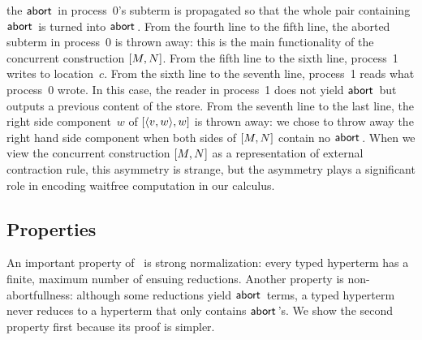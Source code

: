 \begin{example}
 the $\mathsf{abort\,}$ in process~0's subterm is propagated so that the whole pair
 containing $\mathsf{abort\,}$ is turned into $\mathsf{abort\,}$.
 From the fourth line to the fifth line,
 the aborted subterm in process~0 is thrown away: this is
 the main functionality of the concurrent construction $[{M,N}]$.
 From the fifth line to the sixth line,
 process~1 writes to location~$c$.
 From the sixth line to the seventh line,
 process~1 reads what process~0 wrote.
 In this case, the reader in process~1 does not
 yield $\mathsf{abort\,}$ but outputs a previous content of the store.
 From the seventh line to the last line,
 the right side component~$w$ of $[{\langle{v,w}\rangle,w}]$ is thrown away:
 we chose to throw away the right hand side component when both sides
 of $[{M,N}]$ contain no $\mathsf{abort\,}$.  When we view the concurrent construction
 $[{M,N}]$ as a representation of external contraction rule,
 this asymmetry is strange, but the asymmetry plays a significant
 role in encoding waitfree computation in our calculus.
\end{example}


\subsection{Properties}

An important property of
\lgd\, is strong normalization:
every typed hyperterm has a finite, maximum number of ensuing reductions.
Another property is {non-abortfullness}: although some reductions yield
$\mathsf{abort\,}$ terms, a typed hyperterm never reduces to a hyperterm that only
contains $\mathsf{abort\,}$'s.  We show the second property first because its
proof is simpler.


